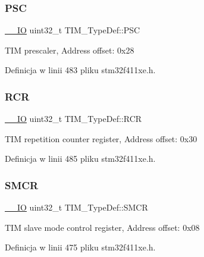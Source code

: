 \subsubsection{\texorpdfstring{P\+SC}{PSC}}
{\footnotesize\ttfamily \hyperlink{core__sc300_8h_aec43007d9998a0a0e01faede4133d6be}{\+\_\+\+\_\+\+IO} uint32\+\_\+t T\+I\+M\+\_\+\+Type\+Def\+::\+P\+SC}

T\+IM prescaler, Address offset\+: 0x28 

Definicja w linii 483 pliku stm32f411xe.\+h.

\mbox{\label{struct_t_i_m___type_def_ad432e2a315abf68e6c295fb4ebc37534}} 
\subsubsection{\texorpdfstring{R\+CR}{RCR}}
{\footnotesize\ttfamily \hyperlink{core__sc300_8h_aec43007d9998a0a0e01faede4133d6be}{\+\_\+\+\_\+\+IO} uint32\+\_\+t T\+I\+M\+\_\+\+Type\+Def\+::\+R\+CR}

T\+IM repetition counter register, Address offset\+: 0x30 

Definicja w linii 485 pliku stm32f411xe.\+h.

\mbox{\label{struct_t_i_m___type_def_a67d30593bcb68b98186ebe5bc8dc34b1}} 
\subsubsection{\texorpdfstring{S\+M\+CR}{SMCR}}
{\footnotesize\ttfamily \hyperlink{core__sc300_8h_aec43007d9998a0a0e01faede4133d6be}{\+\_\+\+\_\+\+IO} uint32\+\_\+t T\+I\+M\+\_\+\+Type\+Def\+::\+S\+M\+CR}

T\+IM slave mode control register, Address offset\+: 0x08 

Definicja w linii 475 pliku stm32f411xe.\+h.

\mbox{\label{struct_t_i_m___type_def_acedfc978c879835c05ef1788ad26b2ff}} 
